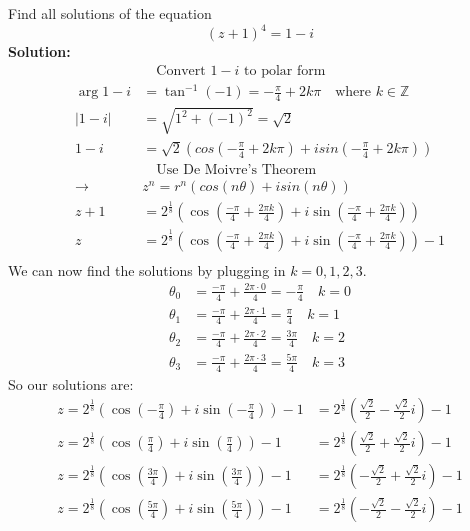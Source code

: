 \begin{example}
    Find all solutions of the equation
    \[(z+1)^4=1-i\]
    \textbf{Solution:} \\
    \begin{align*}
                    & \quad \text{Convert $1-i$ to polar form}                                                           \\
        \arg{1-i}   & = \tan^{-1}(-1) = -\frac{\pi}{4} + 2k\pi        \quad \text{where $k\in\mathbb{Z}$}                \\
        |1-i|       & = \sqrt{1^2+(-1)^2} = \sqrt{2}                                                                     \\
        1-i         & = \sqrt{2}(cos(-\frac{\pi}{4} + 2k\pi)+isin(-\frac{\pi}{4} + 2k\pi))                               \\
                    & \quad \text{Use De Moivre's Theorem}                                                               \\
        \rightarrow & z^n = r^n(cos(n\theta)+isin(n\theta))                                                              \\
        z +1        & = 2^{\frac{1}{8}}(\cos(\frac{-\pi}{4}+\frac{2\pi k}{4})+i\sin(\frac{-\pi}{4}+\frac{2\pi k}{4}))    \\
        z           & = 2^{\frac{1}{8}}(\cos(\frac{-\pi}{4}+\frac{2\pi k}{4})+i\sin(\frac{-\pi}{4}+\frac{2\pi k}{4})) -1 \\
    \end{align*}
    We can now find the solutions by plugging in $k=0,1,2,3$.
    \begin{align}
        \theta_0 & = \frac{-\pi}{4} + \frac{2\pi \cdot 0}{4} = -\frac{\pi}{4} \quad k = 0 \nonumber \\
        \theta_1 & = \frac{-\pi}{4} + \frac{2\pi \cdot 1}{4} = \frac{\pi}{4} \quad k = 1 \nonumber  \\
        \theta_2 & = \frac{-\pi}{4} + \frac{2\pi \cdot 2}{4} = \frac{3\pi}{4} \quad k = 2 \nonumber \\
        \theta_3 & = \frac{-\pi}{4} + \frac{2\pi \cdot 3}{4} = \frac{5\pi}{4} \quad k = 3 \nonumber
    \end{align}
    So our solutions are:
    \begin{align}
        z = 2^{\frac{1}{8}}(\cos(-\frac{\pi}{4})+i\sin(-\frac{\pi}{4})) -1 & = 2^{\frac{1}{8}}(\frac{\sqrt{2}}{2}-\frac{\sqrt{2}}{2}i) -1 \nonumber  \\
        z = 2^{\frac{1}{8}}(\cos(\frac{\pi}{4})+i\sin(\frac{\pi}{4})) -1   & = 2^{\frac{1}{8}}(\frac{\sqrt{2}}{2}+\frac{\sqrt{2}}{2}i) -1 \nonumber  \\
        z = 2^{\frac{1}{8}}(\cos(\frac{3\pi}{4})+i\sin(\frac{3\pi}{4})) -1 & = 2^{\frac{1}{8}}(-\frac{\sqrt{2}}{2}+\frac{\sqrt{2}}{2}i) -1 \nonumber \\
        z = 2^{\frac{1}{8}}(\cos(\frac{5\pi}{4})+i\sin(\frac{5\pi}{4})) -1 & = 2^{\frac{1}{8}}(-\frac{\sqrt{2}}{2}-\frac{\sqrt{2}}{2}i) -1 \nonumber
    \end{align}
\end{example}

